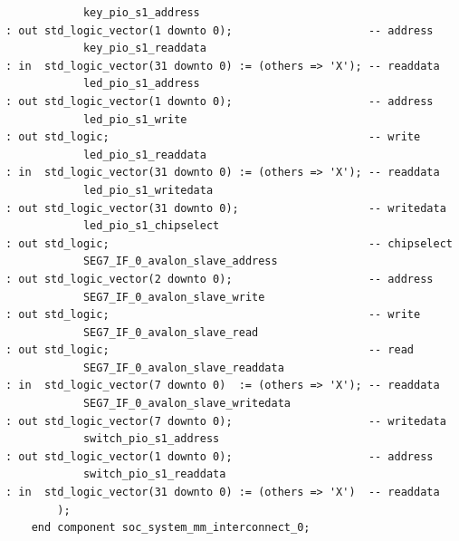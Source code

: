 \documentclass[conference]{IEEEtran}
\begin{document}
\begin{lstlisting}
			key_pio_s1_address                                                  : out std_logic_vector(1 downto 0);                     -- address
			key_pio_s1_readdata                                                 : in  std_logic_vector(31 downto 0) := (others => 'X'); -- readdata
			led_pio_s1_address                                                  : out std_logic_vector(1 downto 0);                     -- address
			led_pio_s1_write                                                    : out std_logic;                                        -- write
			led_pio_s1_readdata                                                 : in  std_logic_vector(31 downto 0) := (others => 'X'); -- readdata
			led_pio_s1_writedata                                                : out std_logic_vector(31 downto 0);                    -- writedata
			led_pio_s1_chipselect                                               : out std_logic;                                        -- chipselect
			SEG7_IF_0_avalon_slave_address                                      : out std_logic_vector(2 downto 0);                     -- address
			SEG7_IF_0_avalon_slave_write                                        : out std_logic;                                        -- write
			SEG7_IF_0_avalon_slave_read                                         : out std_logic;                                        -- read
			SEG7_IF_0_avalon_slave_readdata                                     : in  std_logic_vector(7 downto 0)  := (others => 'X'); -- readdata
			SEG7_IF_0_avalon_slave_writedata                                    : out std_logic_vector(7 downto 0);                     -- writedata
			switch_pio_s1_address                                               : out std_logic_vector(1 downto 0);                     -- address
			switch_pio_s1_readdata                                              : in  std_logic_vector(31 downto 0) := (others => 'X')  -- readdata
		);
	end component soc_system_mm_interconnect_0;


\end{lstlisting}
\end{document}
